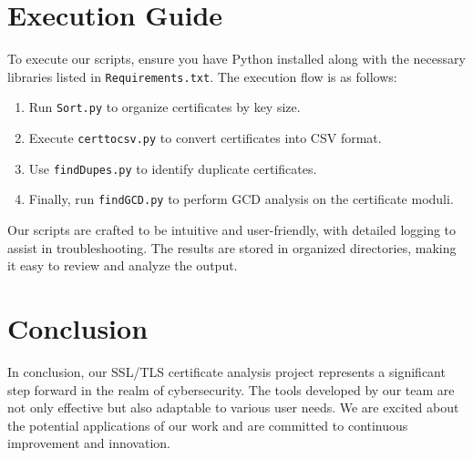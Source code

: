 \documentclass{article}
\begin{document}
\section{Execution Guide}
To execute our scripts, ensure you have Python installed along with the necessary libraries listed in \texttt{Requirements.txt}. The execution flow is as follows:

\begin{enumerate}
    \item Run \texttt{Sort.py} to organize certificates by key size.
    \item Execute \texttt{certtocsv.py} to convert certificates into CSV format.
    \item Use \texttt{findDupes.py} to identify duplicate certificates.
    \item Finally, run \texttt{findGCD.py} to perform GCD analysis on the certificate moduli.
\end{enumerate}

Our scripts are crafted to be intuitive and user-friendly, with detailed logging to assist in troubleshooting. The results are stored in organized directories, making it easy to review and analyze the output.

\section{Conclusion}
In conclusion, our SSL/TLS certificate analysis project represents a significant step forward in the realm of cybersecurity. The tools developed by our team are not only effective but also adaptable to various user needs. We are excited about the potential applications of our work and are committed to continuous improvement and innovation.
\end{document}
